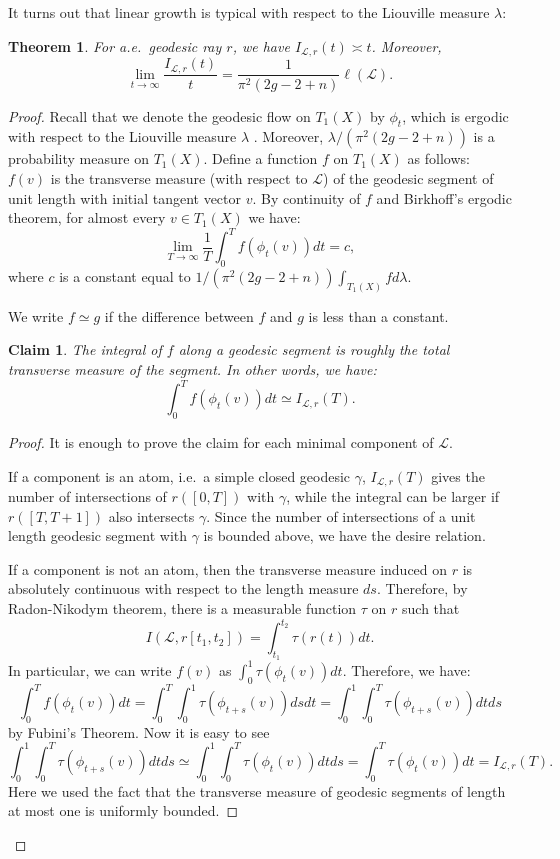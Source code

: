 \documentclass[11pt]{article} %
\theoremstyle{plain}
\newtheorem{thm}{Theorem}[section]
\newtheorem{clm}{Claim}
\theoremstyle{definition}
\numberwithin{equation}{section}
\begin{document}
It turns out that linear growth is typical with respect to the Liouville measure $\lambda$:

\begin{thm}\label{thm:generic}
For a.e.\ geodesic ray $r$, we have $I_{\mathcal{L},r}(t) \asymp t$. Moreover,
$$\lim_{t \rightarrow \infty}\frac{I_{\mathcal{L},r}(t)}t= \frac{1}{\pi^2(2g-2+n)}\ell(\mathcal{L}).$$
\end{thm}
\begin{proof}
Recall that we denote the geodesic flow on $T_1(X)$ by $\phi_t$, which is ergodic with respect to the Liouville measure $\lambda$ \cite{erg.g.f}. Moreover, $\lambda/(\pi^2(2g-2+n))$ is a probability measure on $T_1(X)$. Define a function $f$ on $T_1(X)$ as follows: $f(v)$ is the transverse measure (with respect to $\mathcal{L}$) of the geodesic segment of unit length with initial tangent vector $v$. By continuity of $f$ and Birkhoff's ergodic theorem, for almost every $v \in T_1(X)$ we have:
\begin{equation}\label{erg}
\lim_{T \rightarrow \infty} \frac{1}{T} \int_{0}^{T} f(\phi_t(v)) dt= c, 
\end{equation}
where $c$ is a constant equal to $1/(\pi^2(2g-2+n)) \int_{T_1(X)} f d\lambda$.

We write $f \simeq g$ if the difference between $f$ and $g$ is less than a constant.

\begin{clm}\label{int.f}
The integral of $f$ along a geodesic segment is roughly the total transverse measure of the segment. In other words, we have:
$$\int_{0}^{T} f(\phi_t(v)) dt \simeq I_{\mathcal{L},r}(T).$$
\end{clm}
\begin{proof}
It is enough to prove the claim for each minimal component of $\mathcal{L}$.

If a component is an atom, i.e.\ a simple closed geodesic $\gamma$, $I_{\mathcal{L},r}(T)$ gives the number of intersections of $r([0,T])$ with $\gamma$, while the integral can be larger if $r([T,T+1])$ also intersects $\gamma$. Since the number of intersections of a unit length geodesic segment with $\gamma$ is bounded above, we have the desire relation.

If a component is not an atom, then the transverse measure induced on $r$ is absolutely continuous with respect to the length measure $ds$. Therefore, by Radon-Nikodym theorem, there is a measurable function $\tau$ on $r$ such that
$$ I(\mathcal{L},r[t_1,t_2])= \int_{t_1}^{t_2} \tau(r(t)) dt.$$
In particular, we can write $f(v)$ as $\int_{0}^{1} \tau(\phi_t(v)) dt$.  
Therefore, we have:
$$
\int_{0}^{T} f(\phi_t(v)) dt = \int_{0}^{T} \int_{0}^{1} \tau(\phi_{t+s}(v)) ds dt= \int_{0}^{1} \int_{0}^{T} \tau(\phi_{t+s}(v)) dt ds
$$
by Fubini's Theorem. Now it is easy to see
$$
\int_{0}^{1} \int_{0}^{T} \tau(\phi_{t+s}(v)) dt ds \simeq \int_{0}^{1} \int_{0}^{T} \tau(\phi_{t}(v)) dt ds= \int_{0}^{T} \tau(\phi_{t}(v)) dt= I_{\mathcal{L},r}(T).
$$
Here we used the fact that the transverse measure of geodesic segments of length at most one is uniformly bounded.
\end{proof}


\end{proof}
\end{document}
